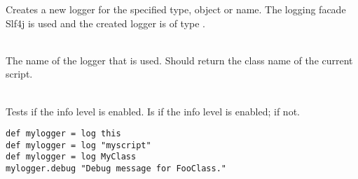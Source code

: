 %


Creates a new logger for the specified type, object or name.
The logging facade Slf4j\cite{slf4j13} is used and the created logger 
is of type \cite{logger13}.

\begin{asparadesc}
%
\item[\code{theContext}] \hfill \\
The name of the logger that is used. Should return the class name of the current
script.
%
\item[\code{isEnabled}] \hfill \\
Tests if the info level is enabled. Is  if the info level is enabled;
 if not.
%
\end{asparadesc}

\begin{lstlisting}[style=Groovybash, label={lst:example_log}, title={%
Creates a new logger with the context.}]
def mylogger = log this
def mylogger = log "myscript"
def mylogger = log MyClass
mylogger.debug "Debug message for FooClass."
\end{lstlisting}

